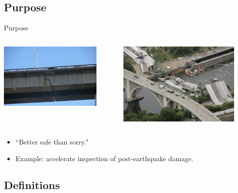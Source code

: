 \documentclass{beamer}
\begin{document}
\subsection{Purpose}
\begin{frame}{Purpose}


\begin{columns}
		\begin{column}{0.5\textwidth} 
		\begin{center}
			\includegraphics[width=5cm]{images/crack.jpg}
		\end{center}
		\end{column}
		\begin{column}{0.7\textwidth}
		\begin{center}
			\pause
			\includegraphics[width=6cm]{images/minneapolis.jpg}
		\end{center}
		\end{column}
	\end{columns}

\vspace{1\baselineskip}
\begin{itemize}
\item ``Better safe than sorry."
\vspace{1\baselineskip}
\item Example: accelerate inspection of post-earthquake damage.
\end{itemize}
\end{frame}


\subsection{Definitions}
\end{document}
